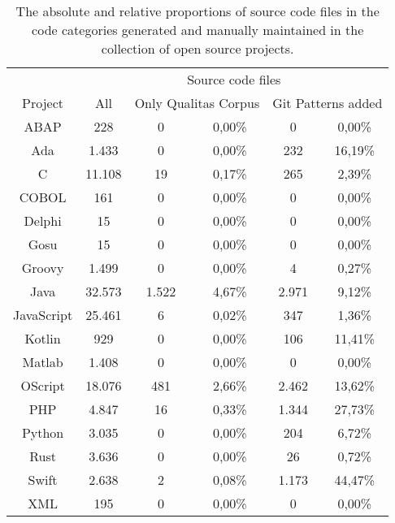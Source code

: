 \setlength{\extrarowheight}{-.0em}
\begin{table}
	\caption[Source code file distributions in the collection of open source projects.]{The absolute and relative proportions of source code files in the code categories generated and manually maintained in the collection of open source projects. }
	\label{table:countGit}
	\begin{tabularx}{\textwidth}{c|c|c|c|c|c}
		 & \multicolumn{5}{c}{Source code files}  \\
		Project & All & \multicolumn{2}{c|}{Only Qualitas Corpus} & \multicolumn{2}{c}{Git Patterns added}  \\
		\hline
		ABAP & 228 & 0 & 0,00\% & 0 & 0,00\% \\
		Ada & 1.433 & 0 & 0,00\% & 232 & 16,19\% \\
		C & 11.108 & 19 & 0,17\% & 265 & 2,39\% \\
		COBOL & 161 & 0 & 0,00\% & 0 & 0,00\% \\
		Delphi & 15 & 0 & 0,00\% & 0 & 0,00\% \\
		Gosu & 15 & 0 & 0,00\% & 0 & 0,00\% \\
		Groovy & 1.499 & 0 & 0,00\% & 4 & 0,27\% \\
		Java & 32.573 & 1.522 & 4,67\% & 2.971 & 9,12\% \\
		JavaScript & 25.461 & 6 & 0,02\% & 347 & 1,36\% \\
		Kotlin & 929 & 0 & 0,00\% & 106 & 11,41\% \\
		Matlab & 1.408 & 0 & 0,00\% & 0 & 0,00\% \\
		OScript & 18.076 & 481 & 2,66\% & 2.462 & 13,62\% \\
		PHP & 4.847 & 16 & 0,33\% & 1.344 & 27,73\% \\
		Python & 3.035 & 0 & 0,00\% & 204 & 6,72\% \\
		Rust & 3.636 & 0 & 0,00\% & 26 & 0,72\% \\
		Swift & 2.638 & 2 & 0,08\% & 1.173 & 44,47\% \\
		XML & 195 & 0 & 0,00\% & 0 & 0,00\% \\		
	\end{tabularx}
\end{table}
\setlength{\extrarowheight}{0em}